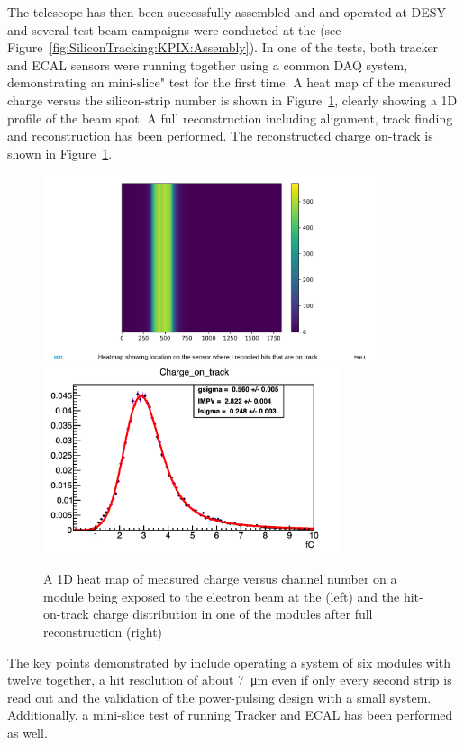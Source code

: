 The \LYCORIS telescope has then been successfully assembled and and operated at DESY and several test beam campaigns were conducted at the \DIITBF (see Figure~\ref{fig:SiliconTracking:KPIX:Assembly}). 
In one of the tests, both \SID tracker and \SID ECAL sensors were running together using a common DAQ system, demonstrating an \SID mini-slice" test for the first time. 
A heat map of the measured charge versus the silicon-strip number is shown in Figure~\ref{fig:SiliconTracking:KPIX:Results}, clearly showing a 1D profile of the beam spot. 
A full reconstruction including alignment, track finding and reconstruction has been performed. The reconstructed charge on-track is shown in Figure~\ref{fig:SiliconTracking:KPIX:Results}. 
\begin{figure}[htbp]
\includegraphics[height=5.5cm]{Tracker/KPIX/KPIX_heatmap_hitsOnTrack.pdf}
\includegraphics[height=5.5cm]{Tracker/KPIX/KPIX_signal_Landau_Run897.png}
\caption{A 1D heat map of measured charge versus channel number on a \LYCORIS module being exposed to the electron beam at the \DIITBF (left) and the hit-on-track charge distribution in 
one of the \LYCORIS modules after full reconstruction (right)}
\label{fig:SiliconTracking:KPIX:Results}
\end{figure}

The key points demonstrated by \LYCORIS include operating a system of six modules with twelve \KPIX together, 
a hit resolution of about \SI{7}{\micro\meter} even if only every second strip is read out and the 
validation of the power-pulsing design with a small system. Additionally, a mini-slice test of running \SID Tracker and \SID ECAL has been performed as well. 

